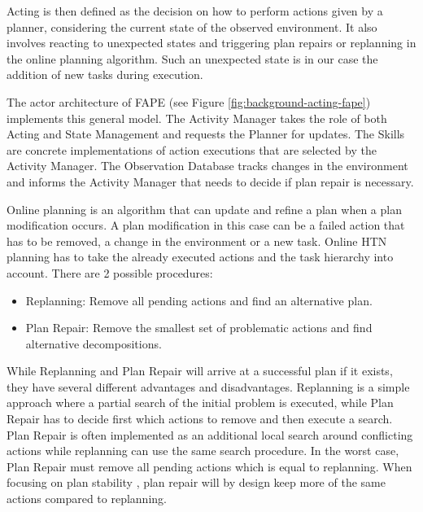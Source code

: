 Acting is then defined as the decision on how to perform actions given by a planner, considering the current state of the observed environment.
It also involves reacting to unexpected states and triggering plan repairs or replanning in the online planning algorithm.
Such an unexpected state is in our case the addition of new tasks during execution.

The actor architecture of FAPE (see Figure \ref{fig:background-acting-fape}) implements this general model.
The Activity Manager takes the role of both Acting and State Management and requests the Planner for updates.
The Skills are concrete implementations of action executions that are selected by the Activity Manager.
The Observation Database tracks changes in the environment and informs the Activity Manager that needs to decide if plan repair is necessary.





Online planning \citep[sec.~2.6.2]{ghallabAutomatedPlanningActing2016} is an algorithm that can update and refine a plan when a plan modification occurs.
A plan modification in this case can be a failed action that has to be removed, a change in the environment or a new task.
Online HTN planning \citep{dvorakPlanningActingTemporal2014} has to take the already executed actions and the task hierarchy into account.
There are 2 possible procedures:
\begin{itemize}
  \item Replanning: Remove all pending actions and find an alternative plan.
  \item Plan Repair: Remove the smallest set of problematic actions and find alternative decompositions.
\end{itemize}

While Replanning and Plan Repair will arrive at a successful plan if it exists, they have several different advantages and disadvantages.
Replanning is a simple approach where a partial search of the initial problem is executed, while Plan Repair has to decide first which actions to remove and then execute a search.
Plan Repair is often implemented as an additional local search around conflicting actions \citep{bajadaTemporalPlanQuality2014} while replanning can use the same search procedure.
In the worst case, Plan Repair must remove all pending actions which is equal to replanning.
When focusing on plan stability \citep{foxPlanStabilityReplanning2006}, plan repair will by design keep more of the same actions compared to replanning.

